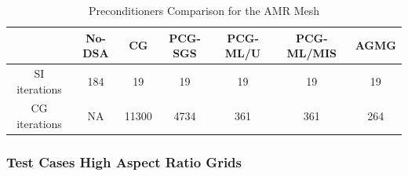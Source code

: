 \documentclass[preprint,10pt]{elsarticle}
\renewcommand{\(}{\left(}
\renewcommand{\)}{\right)}
\renewcommand{\[}{\left[}
\renewcommand{\]}{\right]}
\begin{document}
\begin{table}[H]
  \caption{Preconditioners Comparison for the AMR Mesh}
  \begin{center}
    \begin{tabular}{|c|c|c|c|c|c|c|}
      \hline
       & No-DSA & CG & PCG-SGS & PCG-ML/U & PCG-ML/MIS & AGMG \\
      \hline
   SI iterations & 184     & 19      & 19       & 19      & 19       & 19 \\
   CG iterations & NA      & 11300   & 4734     & 361     & 361      & 264 \\
      \hline
    \end{tabular}
    \label{table_amr}
  \end{center}
\end{table}

\subsubsection{Test Cases High Aspect Ratio Grids}
\end{document}
